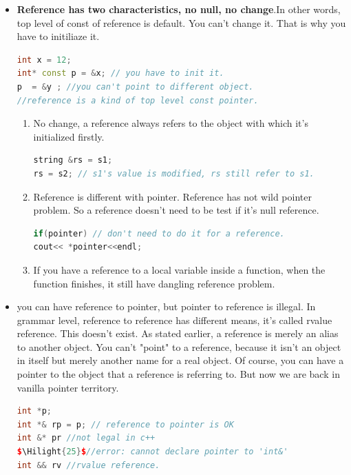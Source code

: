 \documentclass[a4paper,12pt,twoside]{book}
\newcommand{\Hilight}[1]{\makebox[0pt][l]{\color{yellow}\rule[-3pt]{#1em}{11pt}}}
\begin{document}
\begin{itemize}
\item \textbf{Reference has two characteristics, no null, no change}.In other words, top level of const of reference is default. You can't change it. That is why you have to initiliaze it.
\begin{lstlisting}[frame=single, language=c++]
int x = 12;
int* const p = &x; // you have to init it.
p  = &y ; //you can't point to different object.
//reference is a kind of top level const pointer.
\end{lstlisting}

\begin{enumerate}
\item No change, a reference always refers to the object with which it's initialized firstly.
\begin{lstlisting}[frame=single, language=c++]
string &rs = s1;
rs = s2; // s1's value is modified, rs still refer to s1.
\end{lstlisting}

\item Reference is different with pointer. Reference has not wild pointer problem. So a reference doesn't need to be test if it's null reference.
\begin{lstlisting}[frame=single, language=c++]
if(pointer) // don't need to do it for a reference.
cout<< *pointer<<endl;
\end{lstlisting}

\item If you have a reference to a local variable inside a function, when the function finishes, it still have dangling reference problem. 
\end{enumerate}

\item you can have reference to pointer, but pointer to reference is illegal. In grammar level, reference to reference has different means, it's called rvalue reference. This doesn't exist. As stated earlier, a reference is merely an alias to another object. You can't "point" to a reference, because it isn't an object in itself but merely another name for a real object. Of course, you can have a pointer to the object that a reference is referring to. But now we are back in vanilla pointer territory.
\begin{lstlisting}[frame=single, language=c++]
int *p;
int *& rp = p; // reference to pointer is OK
int &* pr //not legal in c++
$\Hilight{25}$//error: cannot declare pointer to 'int&'
int && rv //rvalue reference.
\end{lstlisting}


\end{itemize}
\end{document}
